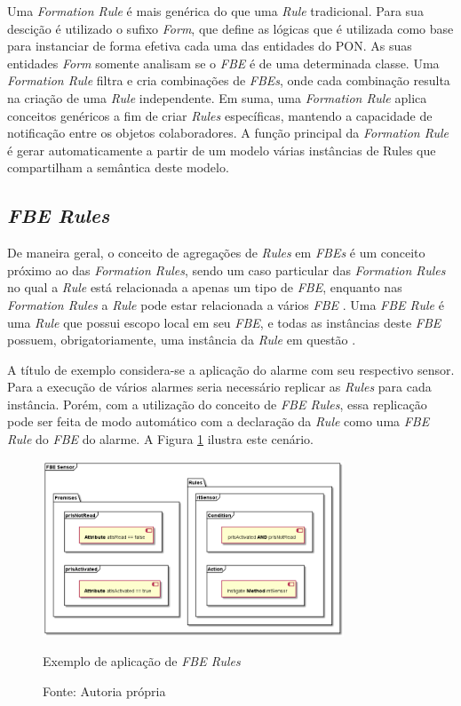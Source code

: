 Uma \textit{Formation Rule} é mais genérica do que uma \textit{Rule}
tradicional. Para sua descição é utilizado o sufixo \textit{Form}, que define as
lógicas que é utilizada como base para instanciar de forma efetiva cada uma das
entidades do PON. As suas entidades \textit{Form} somente analisam se o
\textit{FBE} é de uma determinada classe. Uma \textit{Formation Rule} filtra e
cria combinações de \textit{FBEs}, onde cada combinação resulta na criação de
uma \textit{Rule} independente. Em suma, uma \textit{Formation Rule} aplica
conceitos genéricos a fim de criar \textit{Rules} específicas, mantendo a
capacidade de notificação entre os objetos colaboradores. A função principal da
\textit{Formation Rule} é gerar automaticamente a partir de um modelo várias
instâncias de Rules que compartilham a semântica deste modelo. 


\subsection{\textit{FBE Rules}}\label{sec:fbe_rule}

De maneira geral, o conceito de agregações de \textit{Rules} em \textit{FBEs} é
um conceito próximo ao das \textit{Formation Rules}, sendo um caso particular
das \textit{Formation Rules} no qual a \textit{Rule} está relacionada a apenas
um tipo de \textit{FBE}, enquanto nas \textit{Formation Rules} a \textit{Rule}
pode estar relacionada a vários \textit{FBE} \cite{msc_santos_2017}. Uma
\textit{FBE Rule} é uma \textit{Rule} que possui escopo local em seu
\textit{FBE}, e todas as instâncias deste \textit{FBE} possuem,
obrigatoriamente, uma instância da \textit{Rule} em questão
\cite{doc_ronszcka_2019}.

A título de exemplo considera-se a aplicação do alarme com seu respectivo
sensor. Para a execução de vários alarmes seria necessário replicar as
\textit{Rules} para cada instância. Porém, com a utilização do conceito de
\textit{FBE Rules}, essa replicação pode ser feita de modo automático com a
declaração da \textit{Rule} como uma \textit{FBE Rule} do \textit{FBE} do
alarme. A Figura \ref{fig:fbe_rule} ilustra este cenário.

\begin{figure}[!htb]
  \centering
  \includegraphics[width=0.8\textwidth]{../out/diagrams/fbe_rule/rules.png}
  \smallskip
  \caption{Exemplo de aplicação de \textit{FBE Rules}}
  \caption*{Fonte: Autoria própria}
  \label{fig:fbe_rule}
\end{figure}

